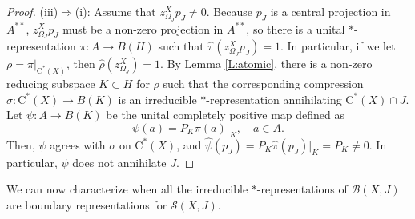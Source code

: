 \documentclass[10pt]{amsart}
\newcommand{\B}{{\mathcal{B}}}
\renewcommand{\S}{{\mathcal{S}}}
\newcommand{\rC}{\mathrm{C}}
\theoremstyle{definition}
\begin{document}
\begin{proof}
 

(iii)$\Rightarrow$(i): Assume that $z_{\Omega_J}^Xp_J\neq 0$. Because $p_J$ is a central projection in $A^{**}$,  $z^X_{\Omega_J}p_J$ must be a non-zero projection in $A^{**}$, so there is a unital $*$-representation $\pi:A\to B(H)$ such that $\widehat\pi(z^X_{\Omega_J}p_J)=1$. In particular, if we let $\rho=\pi|_{\rC^*(X)}$, then $\widehat\rho(z^X_{\Omega_J})=1$. By Lemma \ref{L:atomic}, there is a non-zero reducing subspace $K\subset H$  for $\rho$ such that the corresponding compression $\sigma:\rC^*(X)\to B(K)$ is an irreducible $*$-representation annihilating $\rC^*(X)\cap J$.
Let $\psi:A\to B(K)$ be the unital completely positive map defined as
\[
\psi(a)=P_K \pi(a)|_K,\quad a\in A.
\]
 Then, $\psi$ agrees with $\sigma$ on $\rC^*(X)$, and $\widehat\psi(p_J)=P_K \widehat\pi(p_J)|_K=P_K\neq 0$. 
In particular, $\psi$ does not annihilate $J$. 
\end{proof}


We can now characterize when all the irreducible $*$-representations of $\B(X,J)$ are boundary representations for $\S(X,J)$.
\end{document}
